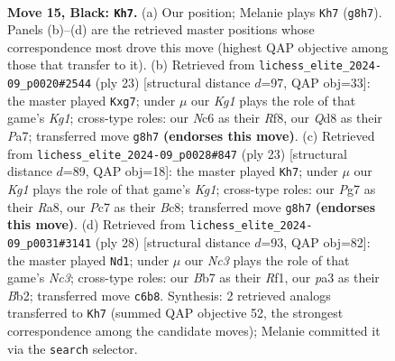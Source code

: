 \documentclass[11pt]{article}
\begin{document}
\clearpage

\begin{figure}[p]\centering
\begin{subfigure}{0.46\textwidth}\centering
\resizebox{\linewidth}{!}{%
\newchessgame
\chessboard[
  setfen={r2q1bk1/1bp1rpp1/p1np3p/1p1Bp3/4P3/P2P1N1P/1PPBRPP1/R2Q2K1 b - - 2 15},
  showmover=false,
  pgfstyle=straightmove, color=movearrow, markmove={g8-h7}
]}
\caption{}
\end{subfigure}\hfill
\begin{subfigure}{0.46\textwidth}\centering
\resizebox{\linewidth}{!}{%
\newchessgame
\chessboard[
  setfen={r4rk1/pp1qppBp/2n1b1p1/2pp4/P4P2/1P2PB2/2PP2PP/RN1Q1RK1 b - - 0 12},
  showmover=false,
  pgfstyle=straightmove, color=movearrow, markmove={g8-g7}
]}
\caption{}
\end{subfigure}
\\[4pt]
\begin{subfigure}{0.46\textwidth}\centering
\resizebox{\linewidth}{!}{%
\newchessgame
\chessboard[
  setfen={r1bq1rk1/ppp1p1b1/2np3p/5p2/2BP1BpP/2N1P3/PPPQ1PP1/R3K2R b KQ - 2 12},
  showmover=false,
  pgfstyle=straightmove, color=movearrow, markmove={g8-h7}
]}
\caption{}
\end{subfigure}\hfill
\begin{subfigure}{0.46\textwidth}\centering
\resizebox{\linewidth}{!}{%
\newchessgame
\chessboard[
  setfen={2rq1rk1/pp3pp1/3pbn1p/4p3/1P1bP3/P1NB3P/1BP1QPP1/R4RK1 w - - 2 15},
  showmover=false,
  pgfstyle=straightmove, color=movearrow, markmove={c3-d1}
]}
\caption{}
\end{subfigure}
\caption{\textbf{Move 15, Black: \texttt{Kh7}.} (a) Our position; Melanie plays \texttt{Kh7} (\texttt{g8h7}). Panels (b)--(d) are the retrieved master positions whose correspondence most drove this move (highest QAP objective among those that transfer to it). (b) Retrieved from \texttt{lichess\_elite\_2024-09\_p0020\#2544} (ply 23) [structural distance $d$=97, QAP obj=33]: the master played \texttt{Kxg7}; under $\mu$ our \emph{Kg1} plays the role of that game's \emph{Kg1}; cross-type roles: our \emph{N}c6 as their \emph{R}f8, our \emph{Q}d8 as their \emph{P}a7; transferred move \texttt{g8h7} \textbf{(endorses this move)}. (c) Retrieved from \texttt{lichess\_elite\_2024-09\_p0028\#847} (ply 23) [structural distance $d$=89, QAP obj=18]: the master played \texttt{Kh7}; under $\mu$ our \emph{Kg1} plays the role of that game's \emph{Kg1}; cross-type roles: our \emph{P}g7 as their \emph{R}a8, our \emph{P}c7 as their \emph{B}c8; transferred move \texttt{g8h7} \textbf{(endorses this move)}. (d) Retrieved from \texttt{lichess\_elite\_2024-09\_p0031\#3141} (ply 28) [structural distance $d$=93, QAP obj=82]: the master played \texttt{Nd1}; under $\mu$ our \emph{Nc3} plays the role of that game's \emph{Nc3}; cross-type roles: our \emph{B}b7 as their \emph{R}f1, our \emph{p}a3 as their \emph{B}b2; transferred move \texttt{c6b8}. Synthesis: 2 retrieved analogs transferred to \texttt{Kh7} (summed QAP objective 52, the strongest correspondence among the candidate moves); Melanie committed it via the \texttt{search} selector.}
\label{fig:thought-m29}
\end{figure}
\end{document}
